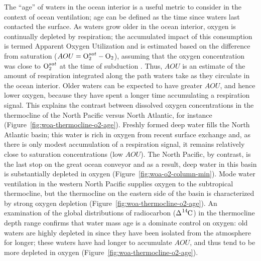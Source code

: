 \documentclass[draft,linenumbers]{report_chapter}
\begin{document}
The ``age'' of waters in the ocean interior is a useful metric to consider in the context of ocean ventilation; age can be defined as the time since waters last contacted the surface.
As waters grow older in the ocean interior, oxygen is continually depleted by respiration; the accumulated impact of this consumption is termed Apparent Oxygen Utilization and is estimated based on the difference from saturation ($AOU = \ce{O2}^{sat} - \ce{O2}$), assuming that the oxygen concentration was close to $\ce{O2}^{sat}$ at the time of subduction \citep{Ito-Follows-etal-2004}.
Thus, $AOU$ is an estimate of the amount of respiration integrated along the path waters take as they circulate in the ocean interior.
Older waters can be expected to have greater $AOU$, and hence lower oxygen, because they have spent a longer time accumulating a respiration signal.
This explains the contrast between dissolved oxygen concentrations in the thermocline of the North Pacific versus North Atlantic, for instance (Figure~\ref{fig:woa-thermocline-o2-age}).
Freshly formed deep water fills the North Atlantic basin; this water is rich in oxygen from recent surface exchange and, as there is only modest accumulation of a respiration signal, it remains relatively close to saturation concentrations (low $AOU$).
The North Pacific, by contrast, is the last stop on the great ocean conveyor and as a result, deep water in this basin is substantially depleted in oxygen (Figure~\ref{fig:woa-o2-column-min}).
Mode water ventilation in the western North Pacific supplies oxygen to the subtropical thermocline, but the thermocline on the eastern side of the basin is characterized by strong oxygen depletion (Figure~\ref{fig:woa-thermocline-o2-age}).
An examination of the global distributions of radiocarbon ($\Delta\ce{^{14}C}$) in the thermocline depth range confirms that water mass age is a dominate control on oxygen: old waters are highly depleted in  since they have been isolated from the atmosphere for longer; these waters have had longer to accumulate $AOU$, and thus tend to be more depleted in oxygen (Figure~\ref{fig:woa-thermocline-o2-age}).
\end{document}
